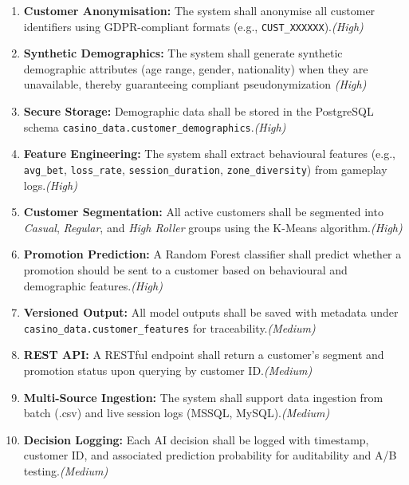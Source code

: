 \documentclass[12pt,a4paper]{report}
\begin{document}
\begin{enumerate}[label=FR\arabic*:]
  \item \textbf{Customer Anonymisation:} The system shall anonymise all customer identifiers using GDPR-compliant formats (e.g., \texttt{CUST\_XXXXXX}).\hfill \textit{(High)}
  
  \item \textbf{Synthetic Demographics:} The system shall generate synthetic demographic attributes (age range, gender, nationality) when they are unavailable, thereby guaranteeing compliant pseudonymization \hfill \textit{(High)}
  
  \item \textbf{Secure Storage:} Demographic data shall be stored in the PostgreSQL schema \texttt{casino\_data.customer\_demographics}.\hfill \textit{(High)}
  
  \item \textbf{Feature Engineering:} The system shall extract behavioural features (e.g., \texttt{avg\_bet}, \texttt{loss\_rate}, \texttt{session\_duration}, \texttt{zone\_diversity}) from gameplay logs.\hfill \textit{(High)}
  
  \item \textbf{Customer Segmentation:} All active customers shall be segmented into \textit{Casual}, \textit{Regular}, and \textit{High Roller} groups using the K-Means algorithm.\hfill \textit{(High)}
  
  \item \textbf{Promotion Prediction:} A Random Forest classifier shall predict whether a promotion should be sent to a customer based on behavioural and demographic features.\hfill \textit{(High)}
  
  \item \textbf{Versioned Output:} All model outputs shall be saved with metadata under \texttt{casino\_data.customer\_features} for traceability.\hfill \textit{(Medium)}
  
  \item \textbf{REST API:} A RESTful endpoint shall return a customer's segment and promotion status upon querying by customer ID.\hfill \textit{(Medium)}
  
  \item \textbf{Multi-Source Ingestion:} The system shall support data ingestion from batch (.csv) and live session logs (MSSQL, MySQL).\hfill \textit{(Medium)}
  
  \item \textbf{Decision Logging:} Each AI decision shall be logged with timestamp, customer ID, and associated prediction probability for auditability and A/B testing.\hfill \textit{(Medium)}
\end{enumerate}
\end{document}
